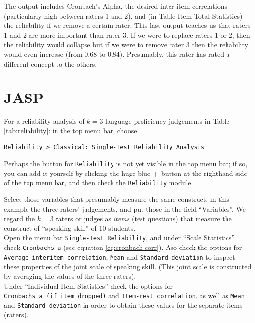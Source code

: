 \documentclass[
]{book}
\begin{document}
The output includes Cronbach's Alpha, the desired inter-item correlations
(particularly high between raters 1 and 2), and (in Table
Item-Total Statistics) the reliability if we remove a certain
rater. This last output teaches us that
raters 1 and 2 are more important than rater 3. If we
were to replace raters 1 or 2, then the reliability would collapse
but if we were to remove rater 3 then the reliability
would even increase (from 0.68 to 0.84). Presumably, this rater
has rated a different concept to the others.

\section{JASP}\label{jasp-10}

For a reliability analysis of \(k=3\) language proficiency
judgements in Table \ref{tab:reliability}: in the top menu bar, choose\\

\begin{verbatim}
Reliability > Classical: Single-Test Reliability Analysis
\end{verbatim}

Perhaps the button for \texttt{Reliability} is not yet visible in the top menu bar; if so, you can add it yourself by clicking the huge blue \textbf{+} button at the righthand side of the top menu bar, and then check the \texttt{Reliability} module.

Select those variables that presumably measure the same construct, in this example the three raters' judgements, and put those in the field ``Variables''. We regard the \(k=3\) raters or judges as \emph{items} (test questions) that measure the construct of ``speaking skill'' of 10 students.\\
Open the menu bar \texttt{Single-Test\ Reliability}, and under ``Scale Statistics'' check \texttt{Cronbach\textquotesingle{}s\ a} (see equation \eqref{eq:cronbach-corr}). Aso check the options for \texttt{Average\ interitem\ correlation}, \texttt{Mean} and \texttt{Standard\ deviation} to inspect these properties of the joint scale of speaking skill. (This joint scale is constructed by averaging the values of the three raters).\\
Under ``Individual Item Statistics'' check the options for \texttt{Cronbach\textquotesingle{}s\ a\ (if\ item\ dropped)} and \texttt{Item-rest\ correlation}, as well as \texttt{Mean} and \texttt{Standard\ deviation} in order to obtain these values for the separate items (raters).
\end{document}
